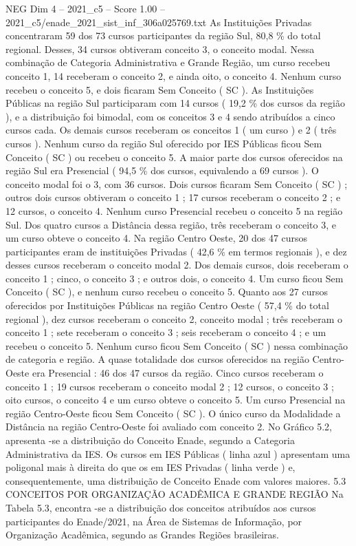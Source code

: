 \begin{textsample}{NEG Dim 4 – 2021\_c5 – Score 1.00 – 2021\_c5/enade\_2021\_sist\_inf\_306a025769.txt}
As Instituições Privadas concentraram 59 dos 73 cursos participantes da região Sul, 80,8 \% do total regional.
Desses, 34 cursos obtiveram conceito 3, o conceito modal.
Nessa combinação de Categoria Administrativa e Grande Região, um curso recebeu conceito 1, 14 receberam o conceito 2, e ainda oito, o conceito 4.
Nenhum curso recebeu o conceito 5, e dois ficaram Sem Conceito ( SC ).
As Instituições Públicas na região Sul participaram com 14 cursos ( 19,2 \% dos cursos da região ), e a distribuição foi bimodal, com os conceitos 3 e 4 sendo atribuídos a cinco cursos cada.
Os demais cursos receberam os conceitos 1 ( um curso ) e 2 ( três cursos ).
Nenhum curso da região Sul oferecido por IES Públicas ficou Sem Conceito ( SC ) ou recebeu o conceito 5.
A maior parte dos cursos oferecidos na região Sul era Presencial ( 94,5 \% dos cursos, equivalendo a 69 cursos ).
O conceito modal foi o 3, com 36 cursos.
Dois cursos ficaram Sem Conceito ( SC ) ; outros dois cursos obtiveram o conceito 1 ; 17 cursos receberam o conceito 2 ; e 12 cursos, o conceito 4.
Nenhum curso Presencial recebeu o conceito 5 na região Sul.
Dos quatro cursos a Distância dessa região, três receberam o conceito 3, e um curso obteve o conceito 4.
Na região Centro Oeste, 20 dos 47 cursos participantes eram de instituições Privadas ( 42,6 \% em termos regionais ), e dez desses cursos receberam o conceito modal 2.
Dos demais cursos, dois receberam o conceito 1 ; cinco, o conceito 3 ; e outros dois, o conceito 4.
Um curso ficou Sem Conceito ( SC ), e nenhum curso recebeu o conceito 5.
Quanto aos 27 cursos oferecidos por Instituições Públicas na região Centro Oeste ( 57,4 \% do total regional ), dez cursos receberam o conceito 2, conceito modal ; três receberam o conceito 1 ; sete receberam o conceito 3 ; seis receberam o conceito 4 ; e um recebeu o conceito 5.
Nenhum curso ficou Sem Conceito ( SC ) nessa combinação de categoria e região.
A quase totalidade dos cursos oferecidos na região Centro-Oeste era Presencial : 46 dos 47 cursos da região.
Cinco cursos receberam o conceito 1 ; 19 cursos receberam o conceito modal 2 ; 12 cursos, o conceito 3 ; oito cursos, o conceito 4 e um curso obteve o conceito 5.
Um curso Presencial na região Centro-Oeste ficou Sem Conceito ( SC ).
O único curso da Modalidade a Distância na região Centro-Oeste foi avaliado com conceito 2.
No Gráfico 5.2, apresenta -se a distribuição do Conceito Enade, segundo a Categoria Administrativa da IES.
Os cursos em IES Públicas ( linha azul ) apresentam uma poligonal mais à direita do que os em IES Privadas ( linha verde ) e, consequentemente, uma distribuição de Conceito Enade com valores maiores. 5.3 CONCEITOS POR ORGANIZAÇÃO ACADÊMICA E GRANDE REGIÃO Na Tabela 5.3, encontra -se a distribuição dos conceitos atribuídos aos cursos participantes do Enade/2021, na Área de Sistemas de Informação, por Organização Acadêmica, segundo as Grandes Regiões brasileiras.

\end{textsample}
